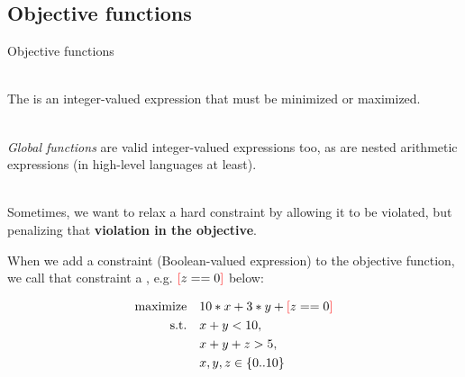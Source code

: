 \documentclass{cons-beamer}
\begin{document}
\subsection{Objective functions}

\begin{frame}{Objective functions}

  $ $\\
  The  is an integer-valued expression that must be minimized or maximized.

  $ $\\
  \textit{Global functions} are valid integer-valued expressions too, as are nested arithmetic expressions (in high-level languages at least).

  $ $\\
  Sometimes, we want to relax a hard constraint by allowing it to be violated, but penalizing that \textbf{violation in the objective}.

  When we add a constraint (Boolean-valued expression) to the objective function, we call that constraint a , e.g. ${\textcolor{red}{\left[\textcolor{black}{z == 0}\right]}}$ below:

  \vspace{-1em}
  {\footnotesize
  \begin{align}
    \mbox{maximize} \quad&10*x + 3*y + {\textcolor{red}{\left[\textcolor{black}{z == 0}\right]}} \\
    \mbox{s.t.} \quad &x + y < 10, \\
                &x + y + z > 5, \\
                &x, y, z \in \{0..10\}
  \end{align}
  }
\end{frame}
\end{document}
